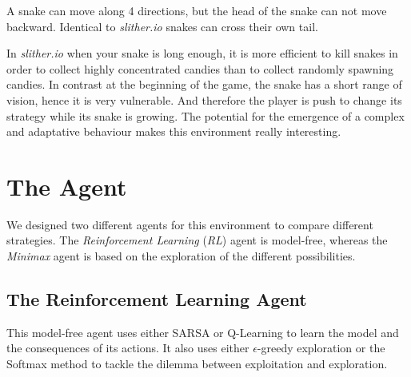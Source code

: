 \documentclass[journal, a4paper]{IEEEtran}
\begin{document}
A snake can move along 4 directions, but the head of the snake can not move backward. Identical to \emph{slither.io} snakes can cross their own tail.

In \emph{slither.io} when your snake is long enough, it is more efficient to kill snakes in order to collect highly concentrated candies than to collect randomly spawning candies. In contrast at the beginning of the game, the snake has a short range of vision, hence it is very vulnerable. And therefore the player is push to change its strategy while its snake is growing. The potential for the emergence of a complex and adaptative behaviour makes this environment really interesting.

\section{The Agent}

We designed two different agents for this environment to compare different strategies.
The \emph{Reinforcement Learning} (\emph{RL}) agent is model-free, whereas the \emph{Minimax} agent is based on the exploration of the different possibilities.

\subsection{The Reinforcement Learning Agent\label{rl_agent}}

This model-free agent uses either SARSA or Q-Learning to learn the model and the consequences of its actions.
It also uses either $\epsilon$-greedy exploration or the Softmax method to tackle the dilemma between exploitation and exploration.
\end{document}
